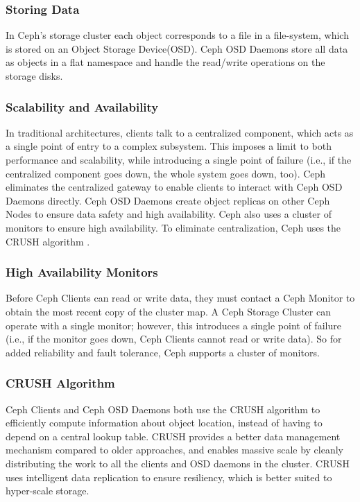\documentclass[a4paper,10pt]{article}
\begin{document}
\begin{adjustwidth}{1.5em}{0pt}
\subsubsection{\small{Storing Data}}
    In Ceph's storage cluster each object corresponds to a file in a file-system, which is stored on an Object Storage Device(OSD). Ceph OSD Daemons store all data as objects in a flat namespace and handle the read/write operations on the storage disks.
\end{adjustwidth}


\begin{adjustwidth}{1.5em}{0pt}
\subsubsection{\small{Scalability and Availability}}
    In traditional architectures, clients talk to a centralized component, which acts as a single point of entry to a complex subsystem. This imposes a limit to both performance and scalability, while introducing a single point of failure (i.e., if the centralized component goes down, the whole system goes down, too). Ceph eliminates the centralized gateway to enable clients to interact with Ceph OSD Daemons directly. Ceph OSD Daemons create object replicas on other Ceph Nodes to ensure data safety and high availability. Ceph also uses a cluster of monitors to ensure high availability. To eliminate centralization, Ceph uses the CRUSH algorithm .
\end{adjustwidth}

\begin{adjustwidth}{1.5em}{0pt}
\subsubsection{\small{High Availability Monitors}}
    Before Ceph Clients can read or write data, they must contact a Ceph Monitor to obtain the most recent copy of the cluster map. A Ceph Storage Cluster can operate with a single monitor; however, this introduces a single point of failure (i.e., if the monitor goes down, Ceph Clients cannot read or write data). So for added reliability and fault tolerance, Ceph supports a cluster of monitors. 
\end{adjustwidth}


\begin{adjustwidth}{1.5em}{0pt}
\subsubsection{\small{CRUSH Algorithm}}
    Ceph Clients and Ceph OSD Daemons both use the CRUSH\cite{crush} algorithm to efficiently compute information about object location, instead of having to depend on a central lookup table. CRUSH provides a better data management mechanism compared to older approaches, and enables massive scale by cleanly distributing the work to all the clients and OSD daemons in the cluster. CRUSH uses intelligent data replication to ensure resiliency, which is better suited to hyper-scale storage. 
\end{adjustwidth}
\end{document}
